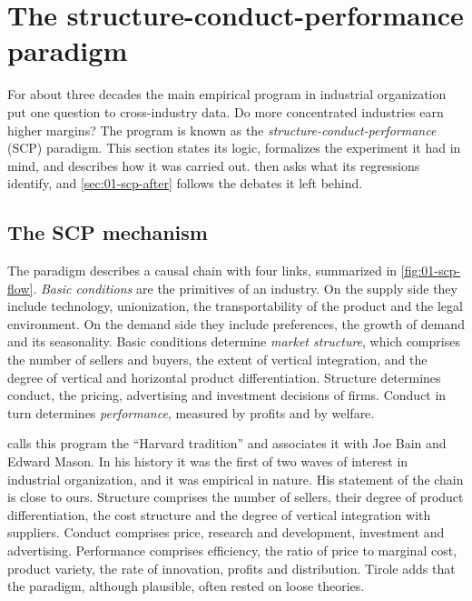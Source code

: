\section{The structure-conduct-performance paradigm}\label{sec:01-scp}

For about three decades the main empirical program in industrial organization put one question to
cross-industry data. Do more concentrated industries earn higher margins? The program is known as the
\emph{structure-conduct-performance} (SCP) paradigm. This section states its logic, formalizes the
experiment it had in mind, and describes how it was carried out.  then asks
what its regressions identify, and \cref{sec:01-scp-after} follows the debates it left behind.

\subsection{The SCP mechanism}\label{sec:01-scp-mechanism}

The paradigm describes a causal chain with four links, summarized in \cref{fig:01-scp-flow}. \emph{Basic
conditions} are the primitives of an industry. On the supply side they include technology, unionization,
the transportability of the product and the legal environment. On the demand side they include
preferences, the growth of demand and its seasonality. Basic conditions determine \emph{market
structure}, which comprises the number of sellers and buyers, the extent of vertical integration, and the
degree of vertical and horizontal product differentiation. Structure determines conduct, the
pricing, advertising and investment decisions of firms. Conduct in turn determines \emph{performance},
measured by profits and by welfare.

\citet[Introduction]{Tirole1988} calls this program the ``Harvard tradition'' and associates it with Joe Bain
and Edward Mason. In his history it was the first of two waves of interest in industrial organization, and it
was empirical in nature. His statement of the chain is close to ours. Structure comprises the number of sellers,
their degree of product differentiation, the cost structure and the degree of vertical integration with
suppliers. Conduct comprises price, research and development, investment and advertising. Performance comprises
efficiency, the ratio of price to marginal cost, product variety, the rate of innovation, profits and
distribution. Tirole adds that the paradigm, although plausible, often rested on loose theories.

